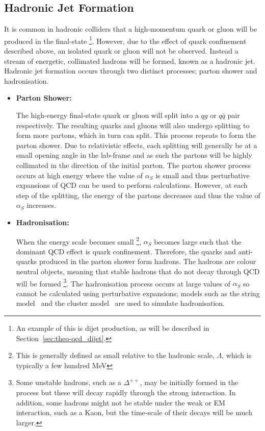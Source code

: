 \subsection{Hadronic Jet Formation}
\label{sec:theo-qcd_jets}

It is common in hadronic colliders that a high-momentum quark or gluon will be produced in the final-state
\footnote{An example of this is dijet production, as will be described in Section~\ref{sec:theo-qcd_dijet}.}.
However, due to the effect of quark confinement described above, an isolated quark or gluon will not be observed.
Instead a stream of energetic, collimated hadrons will be formed, known as a hadronic jet.
Hadronic jet formation occurs through two distinct processes; parton shower and hadronisation.

\begin{itemize}[leftmargin=*]
  
\item\textbf{Parton Shower:}

  The high-energy final-state quark or gluon will split into a $qg$ or $q\bar{q}$ pair respectively.
  The resulting quarks and gluons will also undergo splitting to form more partons,
  which in turn can split. This process repeats to form the parton shower.
  Due to relativistic effects, each splitting will generally be at a small opening angle in the lab-frame
  and as such the partons will be highly collimated in the direction of the initial parton.
  The parton shower process occurs at high energy where the value of $\alpha_S$ is small
  and thus perturbative expansions of QCD can be used to perform calculations.
  However, at each step of the splitting, the energy of the partons decreases
  and thus the value of $\alpha_S$ increases.\vspace{0.5em}
  
\item\textbf{Hadronisation:}
  
  When the energy scale becomes small
  \footnote{This is generally defined as small relative to the hadronic scale, $\Lambda$, which is typically a few hundred MeV},
  $\alpha_S$ becomes large such that the dominant QCD effect is quark confinement.
  Therefore, the quarks and anti-quarks produced in the parton shower form hadrons.
  The hadrons are colour neutral objects, meaning that stable hadrons that do not decay through QCD will be formed
  \footnote{Some unstable hadrons, such as a $\Delta^{++}$, may be initially formed in the process but these will decay rapidly through the strong interaction.
    In addition, some hadrons might not be stable under the weak or EM interaction, such as a Kaon, but the time-scale of their decays will be much larger.}.
  The hadronisation process occurs at large values of $\alpha_S$ so cannot be calculated using perturbative expansions;
  models such as the string model~\cite{theo-qcd_jet_string} and the
  cluster model~\cite{theo-qcd_jet_cluster} are used to simulate hadronisation.

\end{itemize}
  
